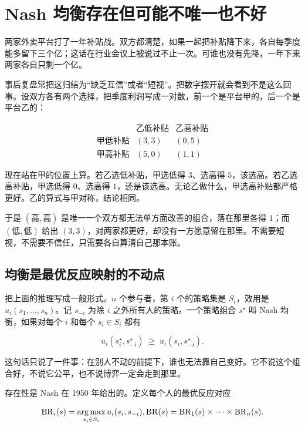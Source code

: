 \section{Nash 均衡存在但可能不唯一也不好}
\label{sec:17-Constrained-Guarantees/06-Games-and-Equilibria/02}

两家外卖平台打了一年补贴战。双方都清楚，如果一起把补贴降下来，各自每季度能多留下三个亿；这话在行业会议上被说过不止一次。可谁也没有先降，一年下来两家各自只剩一个亿。

事后复盘常把这归结为``缺乏互信''或者``短视''。把数字摆开就会看到不是这么回事。设双方各有两个选择，把季度利润写成一对数，前一个是平台甲的，后一个是平台乙的：

\[
\begin{array}{c|cc}
 & \text{乙低补贴} & \text{乙高补贴}\\\hline
\text{甲低补贴} & (3,3) & (0,5)\\
\text{甲高补贴} & (5,0) & (1,1)
\end{array}
\]

现在站在甲的位置上算。若乙选低补贴，甲选低得 \(3\)、选高得 \(5\)，该选高。若乙选高补贴，甲选低得 \(0\)、选高得 \(1\)，还是该选高。无论乙做什么，甲选高补贴都严格更好。乙的算式与甲对称，结论相同。

于是 \((\text{高},\text{高})\) 是唯一一个双方都无法单方面改善的组合，落在那里各得 \(1\)；而 \((\text{低},\text{低})\) 给出 \((3,3)\)，对两家都更好，却没有一方愿意留在那里。不需要短视，不需要不信任，只需要各自算清自己那本账。

\subsection{均衡是最优反应映射的不动点}

把上面的推理写成一般形式。\(n\) 个参与者，第 \(i\) 个的策略集是 \(S_i\)，效用是 \(u_i(s_1,\dots,s_n)\)。记 \(s_{-i}\) 为除 \(i\) 之外所有人的策略。一个策略组合 \(s^\star\) 叫 Nash 均衡，如果对每个 \(i\) 和每个 \(s_i\in S_i\) 都有

\[
u_i(s_i^\star,s_{-i}^\star)\;\ge\;u_i(s_i,s_{-i}^\star).
\]

这句话只说了一件事：在别人不动的前提下，谁也无法靠自己变好。它不说这个组合好，不说它公平，也不说博弈一定会走到那里。

存在性是 Nash 在 1950 年给出的。定义每个人的最优反应对应

\[
\mathrm{BR}_i(s)=\operatorname*{arg\,max}_{s_i\in S_i}u_i(s_i,s_{-i}),
\space
\mathrm{BR}(s)=\mathrm{BR}_1(s)\times\cdots\times\mathrm{BR}_n(s).
\]

